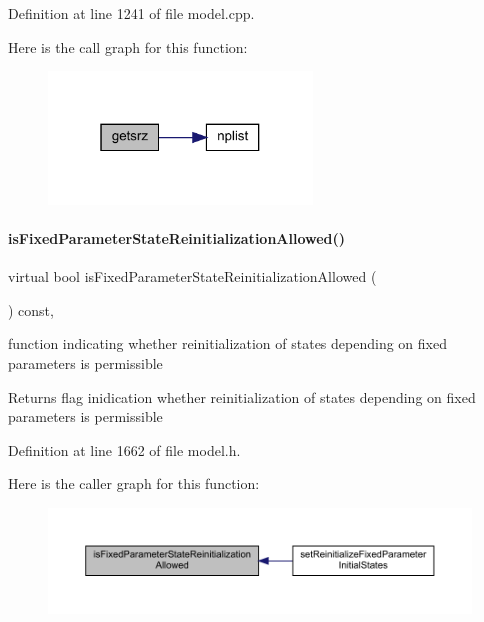 Definition at line 1241 of file model.\+cpp.

Here is the call graph for this function\+:
\nopagebreak
\begin{figure}[H]
\begin{center}
\leavevmode
\includegraphics[width=199pt]{classamici_1_1_model_a49336e5923942fc5b4b26d6facf90b1d_cgraph}
\end{center}
\end{figure}
\mbox{\label{classamici_1_1_model_aee70a0075a3b36896dee7ba80415df3c}} 
\paragraph{\texorpdfstring{is\+Fixed\+Parameter\+State\+Reinitialization\+Allowed()}{isFixedParameterStateReinitializationAllowed()}}
{\footnotesize\ttfamily virtual bool is\+Fixed\+Parameter\+State\+Reinitialization\+Allowed (\begin{DoxyParamCaption}{ }\end{DoxyParamCaption}) const\hspace{0.3cm}{\ttfamily [protected]}, {\ttfamily [virtual]}}

function indicating whether reinitialization of states depending on fixed parameters is permissible \begin{DoxyReturn}{Returns}
flag inidication whether reinitialization of states depending on fixed parameters is permissible 
\end{DoxyReturn}


Definition at line 1662 of file model.\+h.

Here is the caller graph for this function\+:
\nopagebreak
\begin{figure}[H]
\begin{center}
\leavevmode
\includegraphics[width=350pt]{classamici_1_1_model_aee70a0075a3b36896dee7ba80415df3c_icgraph}
\end{center}
\end{figure}



